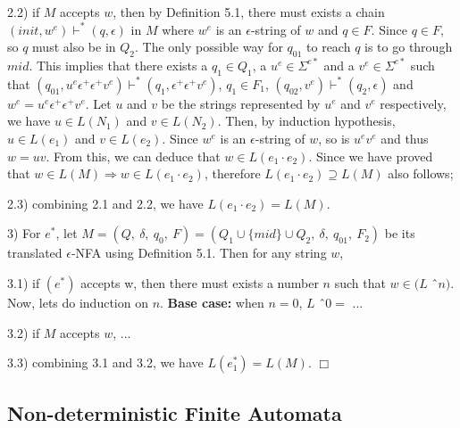 \par 2.2) if \(M\) accepts \(w\), then by Definition 5.1, there must exists
a chain \((init , w^e) \vdash^* (q , \epsilon)\) in \(M\) where
\(w^e\) is an \(\epsilon\)-string of \(w\) and \(q \in F\). Since \(q
\in F\), so \(q\) must also be in \(Q_2\). The only possible way for
\(q_{01}\) to reach \(q\) is to go through \(mid\). This implies that
there exists a \(q_1 \in Q_1\), a \(u^e \in \Sigma^{e*}\) and a \(v^e \in
\Sigma^{e*}\) such that \((q_{01} , u^e\epsilon^+ \epsilon^+ v^e) \vdash^*
(q_1 , \epsilon^+ \epsilon^+ v^e)\), \(q_1 \in F_1\), \((q_{02} , v^e)
\vdash^* (q_2 , \epsilon)\) and \(w^e = u^e\epsilon^+ \epsilon^+
v^e\). Let \(u\) and \(v\) be the strings represented by \(u^e\) and
\(v^e\) respectively, we have \(u \in L(N_1)\) and \(v \in
L(N_2)\). Then, by induction hypothesis, \(u \in L(e_1)\) and \(v \in
L(e_2)\). Since \(w^e\) is an \(\epsilon\)-string of \(w\), so is
\(u^ev^e\) and thus \(w =
uv\). From this, we can deduce that \(w \in L(e_1 \cdot e_2)\). Since
we have proved that \(w \in L(M) \Rightarrow w \in L(e_1 \cdot e_2)\),
therefore \(L(e_1 \cdot e_2) \supseteq L(M)\) also follows;

\par 2.3) combining 2.1 and 2.2, we have \(L(e_1 \cdot e_2) = L(M)\). 
\\
\par 3) For \(e^*\), let \(M = (Q,\ \delta,\ q_0,\ F) = (Q_1 \cup \{mid\} \cup Q_2,\ \delta,\ q_{01},\ F_2)\) be its
translated \(\epsilon\)-NFA using Definition 5.1. Then for any string
\(w\), 

\par 3.1) if \((e^*)\) accepts w, then there must exists a number
\(n\) such that \(w \in (L\) \^\ \(n)\). Now, lets do induction on
\(n\). \textbf{Base case:} when \(n = 0\), \(L\) \^\ \(0 = \) ...

\par 3.2) if \(M\) accepts \(w\), ... 

\par 3.3) combining 3.1 and 3.2, we have \(L(e_1^*) =
L(M)\). \(\Box\)

\subsection{Non-deterministic Finite Automata}

